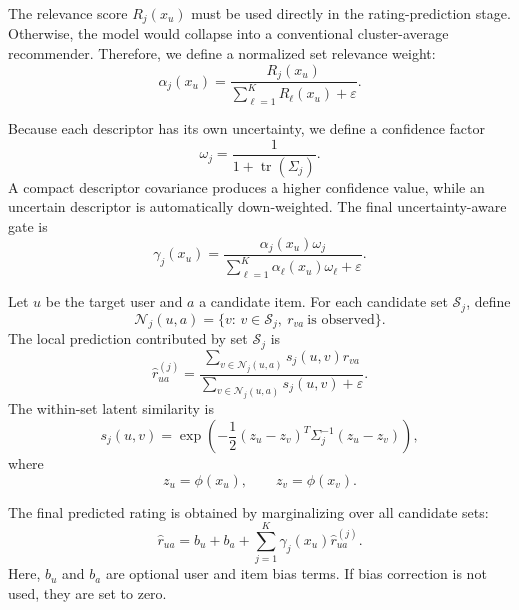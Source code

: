 \documentclass{article}
\theoremstyle{plain}
\theoremstyle{definition}
\theoremstyle{remark}
\begin{document}
The relevance score \(R_j(x_u)\) must be used directly in the rating-prediction stage. Otherwise, the model would collapse into a conventional cluster-average recommender. Therefore, we define a normalized set relevance weight:
\begin{equation}
	\label{eq:normalized_relevance}
	\alpha_j(x_u)
	=
	\frac{
		R_j(x_u)
	}{
		\sum_{\ell=1}^{K}R_\ell(x_u)+\varepsilon
	}.
\end{equation}

Because each descriptor has its own uncertainty, we define a confidence factor
\begin{equation}
	\label{eq:set_confidence}
	\omega_j
	=
	\frac{1}
	{1+\operatorname{tr}(\Sigma_j)}.
\end{equation}
A compact descriptor covariance produces a higher confidence value, while an uncertain descriptor is automatically down-weighted. The final uncertainty-aware gate is
\begin{equation}
	\label{eq:uncertainty_gate}
	\gamma_j(x_u)
	=
	\frac{
		\alpha_j(x_u)\omega_j
	}{
		\sum_{\ell=1}^{K}
		\alpha_\ell(x_u)\omega_\ell+\varepsilon
	}.
\end{equation}

Let \(u\) be the target user and \(a\) a candidate item. For each candidate set \(\mathcal S_j\), define
\[
\mathcal N_j(u,a)
=
\{v:\,v\in\mathcal S_j,\ r_{va}\ \text{is observed}\}.
\]
The local prediction contributed by set \(\mathcal S_j\) is
\begin{equation}
	\label{eq:local_prediction}
	\widehat r_{ua}^{(j)}
	=
	\frac{
		\sum_{v\in\mathcal N_j(u,a)}
		s_j(u,v)r_{va}
	}{
		\sum_{v\in\mathcal N_j(u,a)}
		s_j(u,v)+\varepsilon
	}.
\end{equation}
The within-set latent similarity is
\begin{equation}
	\label{eq:latent_similarity}
	s_j(u,v)
	=
	\exp\left(
	-\frac{1}{2}
	(z_u-z_v)^T
	\Sigma_j^{-1}
	(z_u-z_v)
	\right),
\end{equation}
where
\[
z_u=\phi(x_u),
\qquad
z_v=\phi(x_v).
\]

The final predicted rating is obtained by marginalizing over all candidate sets:
\begin{equation}
	\label{eq:bayesian_rating_prediction}
	\widehat r_{ua}
	=
	b_u+b_a+
	\sum_{j=1}^{K}
	\gamma_j(x_u)
	\widehat r_{ua}^{(j)}.
\end{equation}
Here, \(b_u\) and \(b_a\) are optional user and item bias terms. If bias correction is not used, they are set to zero.
\end{document}

